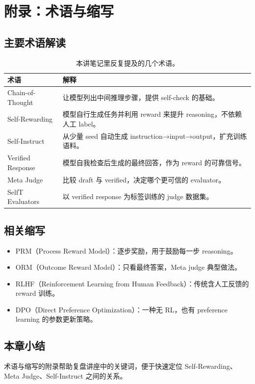 \documentclass[a4paper]{article}
\begin{document}
\section{附录：术语与缩写}
\subsection{主要术语解读}
\begin{table}[H]
\centering
\begin{tabular}{p{4cm}p{11cm}}
\toprule
术语 & 解释 \\
\midrule
Chain-of-Thought & 让模型列出中间推理步骤，提供 self-check 的基础。 \\
Self-Rewarding & 模型自行生成任务并利用 reward 来提升 reasoning，不依赖人工 label。 \\
Self-Instruct & 从少量 seed 自动生成 instruction→input→output，扩充训练语料。 \\
Verified Response & 模型自我检查后生成的最终回答，作为 reward 的可靠信号。 \\
Meta Judge & 比较 draft 与 verified，决定哪个更可信的 evaluator。 \\
SelfT Evaluators & 以 verified response 为标签训练的 judge 数据集。 \\
\bottomrule
\end{tabular}
\caption{本讲笔记里反复提及的几个术语。}
\end{table}

\subsection{相关缩写}
\begin{itemize}
    \item PRM（Process Reward Model）：逐步奖励，用于鼓励每一步 reasoning。
    \item ORM（Outcome Reward Model）：只看最终答案，Meta judge 典型做法。
    \item RLHF（Reinforcement Learning from Human Feedback）：传统含人工反馈的 reward 训练。
    \item DPO（Direct Preference Optimization）：一种无 RL，也有 preference learning 的参数更新策略。
\end{itemize}

\subsection{本章小结}
术语与缩写的附录帮助复盘讲座中的关键词，便于快速定位 Self-Rewarding、Meta Judge、Self-Instruct 之间的关系。
\end{document}
